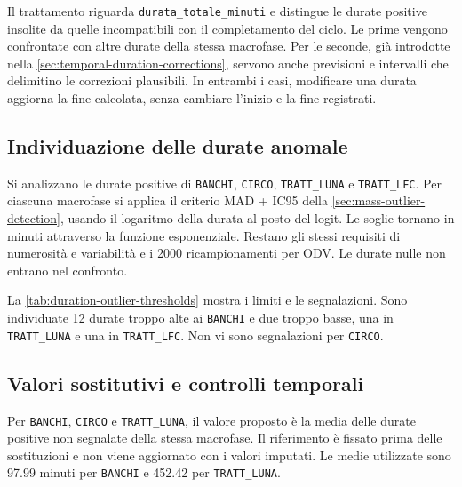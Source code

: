 Il trattamento riguarda \texttt{durata\_totale\_minuti} e distingue le durate positive insolite da quelle incompatibili con il completamento del ciclo. Le prime vengono confrontate con altre durate della stessa macrofase. Per le seconde, già introdotte nella \cref{sec:temporal-duration-corrections}, servono anche previsioni e intervalli che delimitino le correzioni plausibili. In entrambi i casi, modificare una durata aggiorna la fine calcolata, senza cambiare l'inizio e la fine registrati.

\subsection{Individuazione delle durate anomale}
\label{sec:duration-outlier-detection}

Si analizzano le durate positive di \texttt{BANCHI}, \texttt{CIRCO}, \texttt{TRATT\_LUNA} e \texttt{TRATT\_LFC}. Per ciascuna macrofase si applica il criterio MAD + IC95 della \cref{sec:mass-outlier-detection}, usando il logaritmo della durata al posto del logit. Le soglie tornano in minuti attraverso la funzione esponenziale. Restano gli stessi requisiti di numerosità e variabilità e i \num{2000} ricampionamenti per ODV. Le durate nulle non entrano nel confronto.

La \cref{tab:duration-outlier-thresholds} mostra i limiti e le segnalazioni. Sono individuate 12 durate troppo alte ai \texttt{BANCHI} e due troppo basse, una in \texttt{TRATT\_LUNA} e una in \texttt{TRATT\_LFC}. Non vi sono segnalazioni per \texttt{CIRCO}.



\subsection{Valori sostitutivi e controlli temporali}
\label{sec:duration-replacement-rules}

Per \texttt{BANCHI}, \texttt{CIRCO} e \texttt{TRATT\_LUNA}, il valore proposto è la media delle durate positive non segnalate della stessa macrofase. Il riferimento è fissato prima delle sostituzioni e non viene aggiornato con i valori imputati. Le medie utilizzate sono \num{97.99} minuti per \texttt{BANCHI} e \num{452.42} per \texttt{TRATT\_LUNA}.

